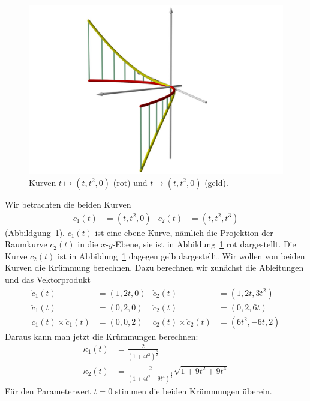 \begin{beispiel}
\begin{figure}
\centering
\includegraphics[width=\hsize]{chapters/3d/kurve.jpg}
\caption{Kurven $t\mapsto(t,t^2,0)$ (rot) und $t\mapsto(t,t^2,0)$ (geld).
\label{skript:kruemmung:fig:kurvekr}}
\end{figure}
Wir betrachten die beiden Kurven
\begin{align*}
c_1(t)&=(t,t^2,0)
&
c_2(t)&=(t,t^2,t^3)
\end{align*}
(Abbildgung~\ref{skript:kruemmung:fig:kurvekr}).
$c_1(t)$ ist eine ebene Kurve, nämlich die Projektion der Raumkurve
$c_2(t)$ in die $x$-$y$-Ebene, sie ist in
Abbildung~\ref{skript:kruemmung:fig:kurvekr} rot dargestellt.
Die Kurve $c_2(t)$ ist in Abbildung~\ref{skript:kruemmung:fig:kurvekr} 
dagegen gelb dargestellt.
Wir wollen von beiden Kurven die Krümmung berechnen.
Dazu berechnen wir zunächst die Ableitungen und das Vektorprodukt
\begin{align*}
\dot c_1(t)
&=
(1,2t,0)
&
\dot c_2(t)
&=
(1,2t,3t^2)
\\
\ddot c_1(t)
&=
(0,2,0)
&
\ddot c_2(t)
&=
(0, 2, 6t)
\\
\dot c_1(t)\times \ddot c_1(t)
&=
(0,0,2)
&
\dot c_2(t)\times \ddot c_2(t)
&=
(6t^2,-6t,2)
\end{align*}
Daraus kann man jetzt die Krümmungen berechnen:
\begin{align*}
\kappa_1(t)
&=
\frac{2}{(1+4t^2)^{\frac32}}
\\
\kappa_2(t)
&=
\frac{2}{(1+4t^2 + 9t^4)^{\frac32}}
\sqrt{1+9t^2+9t^4}
\end{align*}
Für den Parameterwert $t=0$ stimmen die beiden Krümmungen überein.
\end{beispiel}

